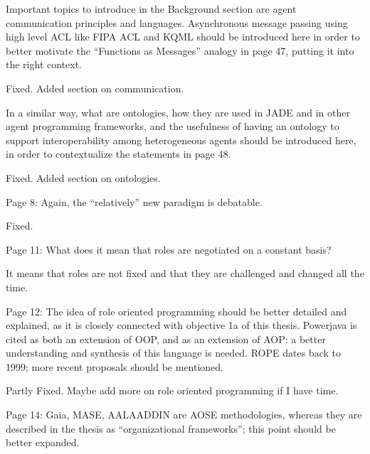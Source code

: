 \documentclass{article}
\newcommand{\todo}[1]{[\textcolor{red}{TODO}: #1]}
\newenvironment{them}{\noindent\begingroup\color{blue}}{\endgroup\par}
\begin{document}
\begin{them}

Important topics to introduce in the Background section are agent communication
principles and languages. Asynchronous message passing using high level ACL
like FIPA ACL and KQML should be introduced here in order to better motivate
the “Functions as Messages” analogy in page 47, putting it into the right
context.

\end{them}
Fixed. Added section on communication.

\begin{them}

In a similar way, what are ontologies, how they are used in JADE and in other
agent programming frameworks, and the usefulness of having an ontology to
support interoperability among heterogeneous agents should be introduced here,
in order to contextualize the statements in page 48.

\end{them}
Fixed. Added section on ontologies.

\begin{them}

Page 8:
Again, the “relatively” new paradigm is debatable.
\end{them}
Fixed. 

\begin{them}

Page 11:
What does it mean that roles are negotiated on a constant basis?
\end{them}
It means that roles are not fixed and that they are challenged and changed all
the time.  

\begin{them}

Page 12:
The idea of role oriented programming should be better detailed and explained,
as it is closely connected with objective 1a of this thesis. Powerjava is cited
as both an extension of OOP, and as an extension of AOP: a better understanding
and synthesis of this language is needed. ROPE dates back to 1999; more recent
proposals should be mentioned.

\end{them}
Partly Fixed. Maybe add more on role oriented programming if I have time.

\begin{them}

Page 14:
Gaia, MASE, AALAADDIN are AOSE methodologies, whereas they are described in the
thesis as “organizational frameworks”; this point should be better expanded.

\end{them}
\todo{Expand this }
\end{document}
